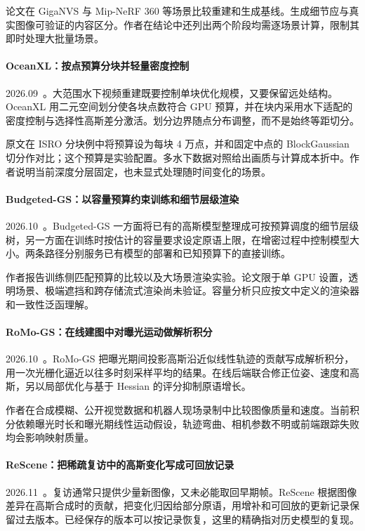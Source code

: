 论文在 GigaNVS 与 Mip-NeRF 360 等场景比较重建和生成基线。生成细节应与真实图像可验证的内容区分。作者在结论中还列出两个阶段均需逐场景计算，限制其即时处理大批量场景。

\paragraph{OceanXL：按点预算分块并轻量密度控制}
2026.09~\cite{2609_29985}。大范围水下视频重建既要控制单块优化规模，又要保留远处结构。OceanXL 用二元空间划分使各块点数符合 GPU 预算，并在块内采用水下适配的密度控制与选择性高斯差分激活。划分边界随点分布调整，而不是始终等距切分。

原文在 ISRO 分块例中将预算设为每块 4 万点，并和固定中点的 BlockGaussian 切分作对比；这个预算是实验配置。多水下数据对照给出画质与计算成本折中。作者说明当前深度分层固定，也未显式处理随时间变化的场景。

\paragraph{Budgeted-GS：以容量预算约束训练和细节层级渲染}
2026.10~\cite{2610_03162}。Budgeted-GS 一方面将已有的高斯模型整理成可按预算调度的细节层级树，另一方面在训练时按估计的容量要求设定原语上限，在增密过程中控制模型大小。两条路径分别服务已有模型的部署和已知预算下的直接训练。

作者报告训练侧匹配预算的比较以及大场景渲染实验。论文限于单 GPU 设置，透明场景、极端遮挡和跨存储流式渲染尚未验证。容量分析只应按文中定义的渲染器和一致性泛函理解。

\paragraph{RoMo-GS：在线建图中对曝光运动做解析积分}
2026.10~\cite{2610_24605}。RoMo-GS 把曝光期间投影高斯沿近似线性轨迹的贡献写成解析积分，用一次光栅化逼近以往多时刻采样平均的结果。在线后端联合修正位姿、速度和高斯，另以局部优化与基于 Hessian 的评分抑制原语增长。

作者在合成模糊、公开视觉数据和机器人现场录制中比较图像质量和速度。当前积分依赖曝光时长和曝光期线性运动假设，轨迹弯曲、相机参数不明或前端跟踪失败均会影响映射质量。

\paragraph{ReScene：把稀疏复访中的高斯变化写成可回放记录}
2026.11~\cite{2611_20433}。复访通常只提供少量新图像，又未必能取回早期帧。ReScene 根据图像差异在高斯合成时的贡献，把变化归因给部分原语，用增补和可回放的更新记录保留过去版本。已经保存的版本可以按记录恢复，这里的精确指对历史模型的复现。

